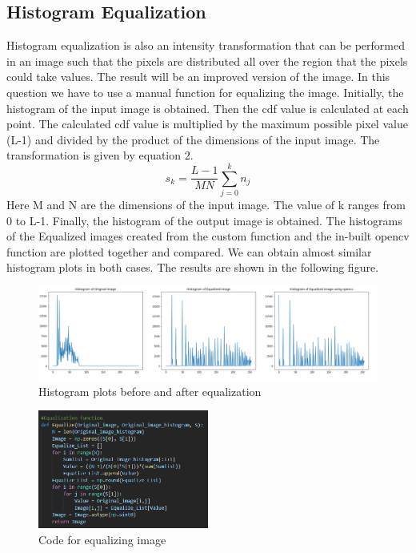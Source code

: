 \documentclass[11pt]{article}
\begin{document}
\begin{flushleft}
\section{Histogram Equalization}
Histogram equalization is also an intensity transformation that can be performed in an image such that the pixels are distributed all over the region that the pixels could take values. The result will be an improved version of the image. In this question we have to use a manual function for equalizing the image. Initially, the histogram of the input image is obtained. Then the cdf value is calculated at each point. The calculated cdf value is multiplied by the maximum possible pixel value (L-1) and divided by the product of the dimensions of the input image. The transformation is given by equation 2. 
\begin{equation}\label{Equation 2: Histogram Equalization}
    s_k = \frac{L-1}{MN}\sum_{j=0}^{k} n_j
\end{equation}
Here M and N are the dimensions of the input image. The value of k ranges from 0 to L-1. Finally, the histogram of the output image is obtained. The histograms of the Equalized images created from the custom function and the in-built opencv function are plotted together and compared. We can obtain almost similar histogram plots in both cases. The results are shown in the following figure.
\begin{figure}[htp]
    \centering
    \includegraphics[width=1.\textwidth]{HistogramEqualization.png}
    \caption{Histogram plots before and after equalization}
\end{figure}
\begin{figure}[htp]
    \centering
    \includegraphics[width=0.5\textwidth]{Question4code.png}
    \caption{Code for equalizing image}
\end{figure}

\end{flushleft}
\end{document}
